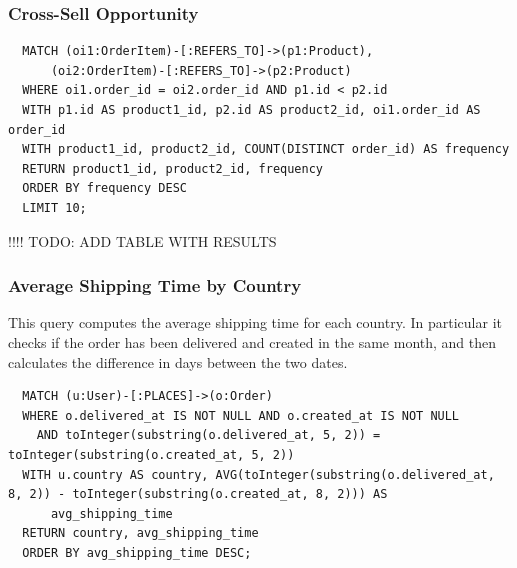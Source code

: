 \documentclass[a4paper,12pt]{article}
\begin{document}
\subsubsection{Cross-Sell Opportunity}
\begin{verbatim}
  MATCH (oi1:OrderItem)-[:REFERS_TO]->(p1:Product),
      (oi2:OrderItem)-[:REFERS_TO]->(p2:Product)
  WHERE oi1.order_id = oi2.order_id AND p1.id < p2.id  
  WITH p1.id AS product1_id, p2.id AS product2_id, oi1.order_id AS order_id
  WITH product1_id, product2_id, COUNT(DISTINCT order_id) AS frequency
  RETURN product1_id, product2_id, frequency
  ORDER BY frequency DESC
  LIMIT 10;
\end{verbatim}

!!!! TODO: ADD TABLE WITH RESULTS

\subsubsection{Average Shipping Time by Country}
This query computes the average shipping time for each country.
In particular it checks if the order has been delivered and created in the same month, and then calculates the difference in days between the two dates.
\begin{verbatim}
  MATCH (u:User)-[:PLACES]->(o:Order)
  WHERE o.delivered_at IS NOT NULL AND o.created_at IS NOT NULL
    AND toInteger(substring(o.delivered_at, 5, 2)) = toInteger(substring(o.created_at, 5, 2))
  WITH u.country AS country, AVG(toInteger(substring(o.delivered_at, 8, 2)) - toInteger(substring(o.created_at, 8, 2))) AS
      avg_shipping_time
  RETURN country, avg_shipping_time
  ORDER BY avg_shipping_time DESC;
\end{verbatim}
\end{document}
